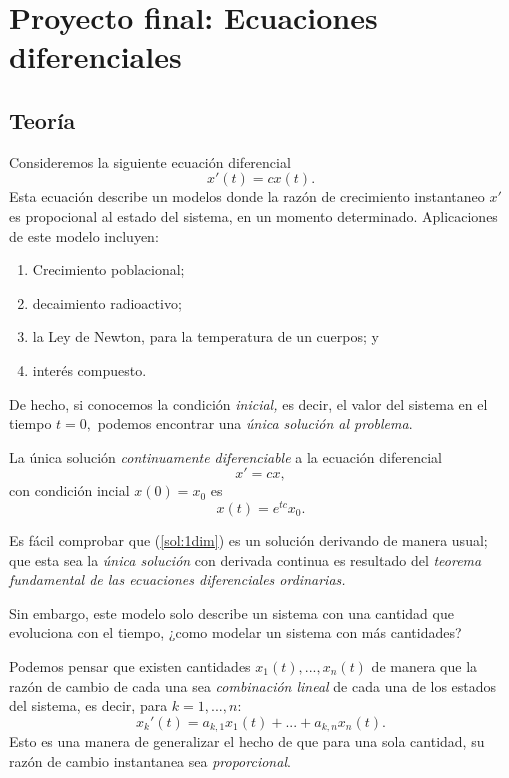 \section{Proyecto final: Ecuaciones diferenciales}

\subsection*{Teoría}

Consideremos la siguiente ecuación diferencial
$$
x'(t)=cx(t).
$$
Esta ecuación describe un modelos donde la razón de crecimiento instantaneo $x'$ es propocional al estado del sistema,
en un momento determinado. Aplicaciones de este modelo incluyen:
\begin{enumerate}
 \item Crecimiento poblacional;
 \item decaimiento radioactivo;
 \item la Ley de Newton, para la temperatura de un cuerpos; y
 \item interés compuesto.
\end{enumerate}

De hecho, si conocemos la condición \emph{inicial,} es decir, el valor del sistema en el tiempo $t=0,$ podemos
encontrar una \emph{única solución al problema}.

\begin{thm}
 La única solución \emph{continuamente diferenciable} a la ecuación diferencial
 $$
x'=cx,
 $$
 con condición incial $x(0)=x_{0}$ es
\begin{equation}
 \label{sol:1dim}
 x(t)=e^{tc}x_{0}.
\end{equation}

 \end{thm}

Es fácil comprobar que (\ref{sol:1dim}) es un solución derivando de manera usual; que esta sea la \emph{única solución}
con derivada continua es resultado del \emph{teorema fundamental de las ecuaciones diferenciales ordinarias.}

Sin embargo, este modelo solo describe un sistema con una cantidad que evoluciona con el tiempo, ¿como modelar un
sistema con más cantidades?

Podemos pensar que existen cantidades $x_{1}(t),...,x_{n}(t)$ de manera que la razón de cambio de cada una sea
\emph{combinación lineal} de cada una de los estados del sistema, es decir, para $k=1,...,n$:
$$
x_{k}'(t)=a_{k,1}x_{1}(t)+...+a_{k,n}x_{n}(t).
$$
Esto es una manera de generalizar el hecho de que para una sola cantidad, su razón de cambio instantanea sea
\emph{proporcional}.

